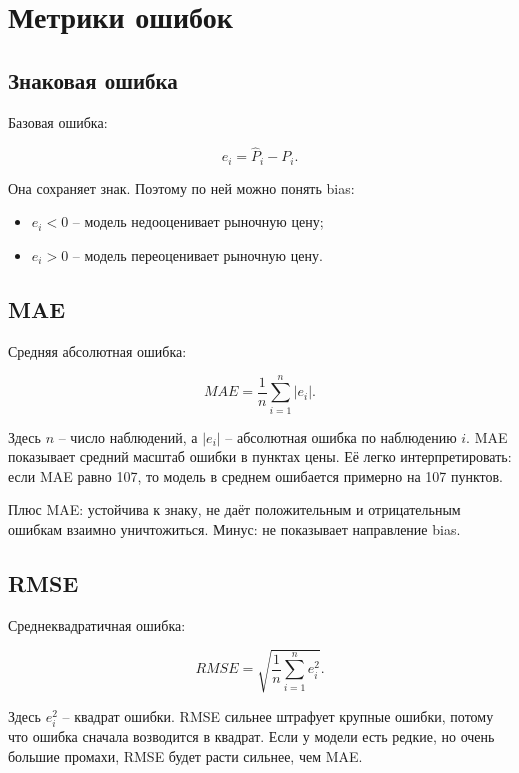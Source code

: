 \documentclass[11pt,a4paper]{article}
\begin{document}
\section{Метрики ошибок}

\subsection{Знаковая ошибка}

Базовая ошибка:

\begin{equation}
e_i=\widehat{P}_i-P_i.
\end{equation}

Она сохраняет знак. Поэтому по ней можно понять bias:

\begin{itemize}
    \item $e_i<0$ -- модель недооценивает рыночную цену;
    \item $e_i>0$ -- модель переоценивает рыночную цену.
\end{itemize}

\subsection{MAE}

Средняя абсолютная ошибка:

\begin{equation}
MAE =
\frac{1}{n}
\sum_{i=1}^{n}
|e_i|.
\end{equation}

Здесь $n$ -- число наблюдений, а $|e_i|$ -- абсолютная ошибка по наблюдению $i$. MAE показывает средний масштаб ошибки в пунктах цены. Её легко интерпретировать: если MAE равно 107, то модель в среднем ошибается примерно на 107 пунктов.

Плюс MAE: устойчива к знаку, не даёт положительным и отрицательным ошибкам взаимно уничтожиться. Минус: не показывает направление bias.

\subsection{RMSE}

Среднеквадратичная ошибка:

\begin{equation}
RMSE =
\sqrt{
\frac{1}{n}
\sum_{i=1}^{n}
e_i^2
}.
\end{equation}

Здесь $e_i^2$ -- квадрат ошибки. RMSE сильнее штрафует крупные ошибки, потому что ошибка сначала возводится в квадрат. Если у модели есть редкие, но очень большие промахи, RMSE будет расти сильнее, чем MAE.
\end{document}
